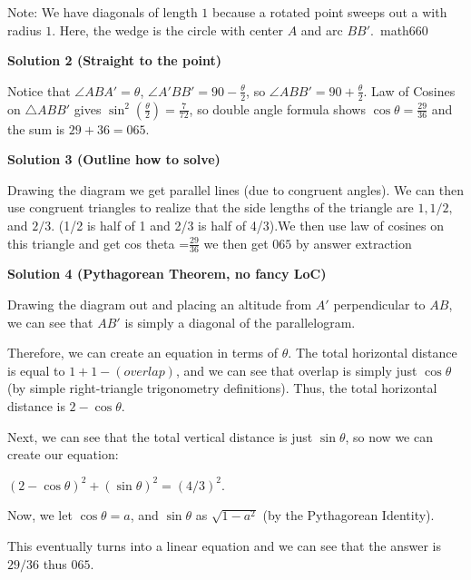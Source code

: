 \begin{enumerate}
 
Note: We have diagonals of length $1$ because a rotated point sweeps out a with radius $1$. Here, the wedge is the circle with center $A$ and arc $BB\prime$.~math660

 



\textbf{Solution 2 (Straight to the point)}

Notice that $\angle ABA ' = \theta$, $\angle A ' B B ' = 90 - \frac{\theta}{2}$, so $\angle ABB ' = 90 + \frac{\theta}{2}$. Law of Cosines on $\triangle ABB '$ gives $\sin ^2 (\frac{\theta}{2}) = \frac{7}{72}$, so double angle formula shows $\cos \theta = \frac{29}{36}$ and the sum is $29 + 36 = \boxed {065}$. 

 



\textbf{Solution 3 (Outline how to solve)}

Drawing the diagram we get parallel lines (due to congruent angles). We can then use congruent triangles to realize that the side lengths of the triangle are $1, 1/2,$ and $2/3$. (1/2 is half of 1 and 2/3 is half of 4/3).We then use law of cosines on this triangle and get cos theta =$\frac{29}{36}$ we then get $\boxed{065}$ by answer extraction

 



\textbf{Solution 4 (Pythagorean Theorem, no fancy LoC)}

Drawing the diagram out and placing an altitude from $A'$ perpendicular to $AB$, we can see that $AB'$ is simply a diagonal of the parallelogram. 

 Therefore, we can create an equation in terms of $\theta$. The total horizontal distance is equal to $1 + 1 - (overlap)$, and we can see that overlap is simply just $\cos \theta$ (by simple right-triangle trigonometry definitions). Thus, the total horizontal distance is $2 - \cos \theta$. 

 Next, we can see that the total vertical distance is just $\sin \theta$, so now we can create our equation: 

 $(2 - \cos \theta) ^2 + (\sin \theta) ^2 = (4/3)^2$. 

 Now, we let $\cos \theta = a$, and $\sin \theta$ as $\sqrt{1-a^2}$ (by the Pythagorean Identity). 

 This eventually turns into a linear equation and we can see that the answer is $29/36$ thus $\boxed{065}$. 

 




\end{enumerate}
